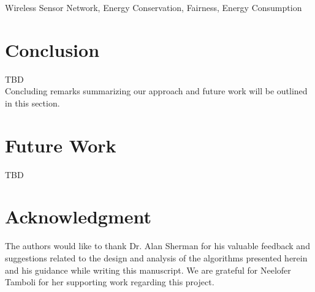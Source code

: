 \documentclass[11pt,conference]{IEEEtran}
\begin{document}
\begin{keywords}
Wireless Sensor Network, Energy Conservation, Fairness, Energy Consumption
\end{keywords}

\IEEEpeerreviewmaketitle










\section{Conclusion}\label{conclusion}
TBD\\
Concluding remarks summarizing our approach and future work will be outlined in this section.

\section{Future Work}\label{futureWork}
TBD

\section*{Acknowledgment}

The authors would like to thank Dr. Alan Sherman for his valuable feedback and suggestions related to the design and analysis of the algorithms presented herein and his guidance while writing this manuscript. We are grateful for Neelofer Tamboli for her supporting work regarding this project.






\onecolumn


\end{document}
